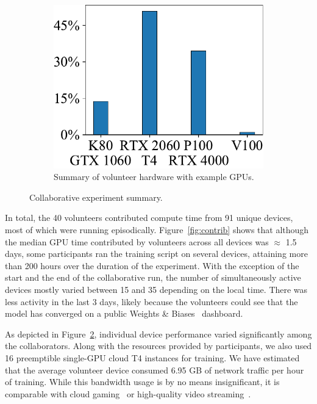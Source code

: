 \begin{figure}[b]
\begin{subfigure}[t]{0.3\textwidth}
\includegraphics[width=\textwidth]{resources/gpu_hist.pdf}
\caption{Summary of volunteer hardware with example GPUs.}
\label{fig:device}
\end{subfigure}
\vspace{-4pt}
\caption{Collaborative experiment summary.}
\end{figure}


In total, the 40 volunteers contributed compute time from 91 unique devices, most of which were running episodically. Figure~\ref{fig:contrib} shows that although the median GPU time contributed by volunteers across all devices was $\approx$ 1.5 days, some participants ran the training script on several devices, attaining more than 200 hours over the duration of the experiment. With the exception of the start and the end of the collaborative run, the number of simultaneously active devices mostly varied between 15 and 35 depending on the local time. There was less activity in the last 3 days, likely because the volunteers could see that the model has converged on a public Weights \& Biases~\cite{wandb} dashboard.

As depicted in Figure~\ref{fig:device}, individual device performance varied significantly among the collaborators. Along with the resources provided by participants, we also used 16 preemptible single-GPU cloud T4 instances for training.
We have estimated that the average volunteer device consumed 6.95 GB of network traffic per hour of training. While this bandwidth usage is by no means insignificant, it is comparable with cloud gaming~\cite{google_stadia} or high-quality video streaming~\cite{netflix}.

